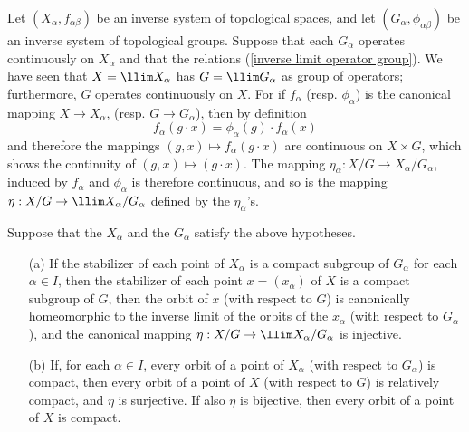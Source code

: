 Let $(X_\alpha,f_{\alpha\beta})$ be an inverse system of topological spaces, and let $(G_\alpha,\phi_{\alpha\beta})$ be an inverse system of topological groups. Suppose that each $G_\alpha$ operates continuously on $X_\alpha$ and that the relations (\ref{inverse limit operator group}). We have seen that $X=\llim X_\alpha$ has $G=\llim G_\alpha$ as group of operators; furthermore, $G$ operates continuously on $X$. For if $f_\alpha$ (resp. $\phi_\alpha$) is the canonical mapping $X\to X_\alpha$, (resp. $G\to G_\alpha$), then by definition
\[f_\alpha(g\cdot x)=\phi_\alpha(g)\cdot f_\alpha(x)\]
and therefore the mappings $(g,x)\mapsto f_\alpha(g\cdot x)$ are continuous on $X\times G$, which shows the continuity of $(g,x)\mapsto(g\cdot x)$. The mapping $\eta_\alpha:X/G\to X_\alpha/G_\alpha$, induced by $f_\alpha$ and $\phi_\alpha$ is therefore continuous, and so is the mapping $\eta:X/G\to\llim X_\alpha/G_\alpha$ defined by the $\eta_\alpha$'s.
\begin{proposition}\label{inverse limit orbit stabilizer compact prop}
Suppose that the $X_\alpha$ and the $G_\alpha$ satisfy the above hypotheses.
\begin{itemize}
\item[(a)] If the stabilizer of each point of $X_\alpha$ is a compact subgroup of $G_\alpha$ for each $\alpha\in I$, then the stabilizer of each point $x=(x_\alpha)$ of $X$ is a compact subgroup of $G$, then the orbit of $x$ (with respect to $G$) is canonically homeomorphic to the inverse limit of the orbits of the $x_\alpha$ (with respect to $G_\alpha$), and the canonical mapping $\eta:X/G\to\llim X_\alpha/G_\alpha$ is injective.
\item[(b)] If, for each $\alpha\in I$, every orbit of a point of $X_\alpha$ (with respect to $G_\alpha$) is compact, then every orbit of a point of $X$ (with respect to $G$) is relatively compact, and $\eta$ is surjective. If also $\eta$ is bijective, then every orbit of a point of $X$ is compact.
\end{itemize}
\end{proposition}
